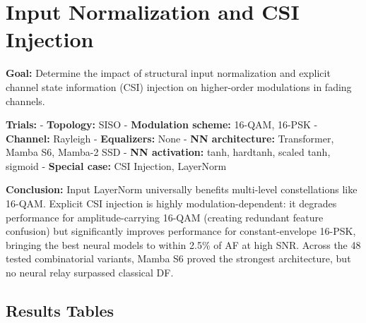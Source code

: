 \section{Input Normalization and CSI Injection}\label{sec:input-normalization-and-csi-injection}

\textbf{Goal:} Determine the impact of structural input normalization and explicit channel state information (CSI) injection on higher-order modulations in fading channels.

\textbf{Trials:} - \textbf{Topology:} SISO - \textbf{Modulation scheme:} 16-QAM, 16-PSK - \textbf{Channel:} Rayleigh - \textbf{Equalizers:} None - \textbf{NN architecture:} Transformer, Mamba S6, Mamba-2 SSD - \textbf{NN activation:} tanh, hardtanh, scaled tanh, sigmoid - \textbf{Special case:} CSI Injection, LayerNorm

\textbf{Conclusion:} Input LayerNorm universally benefits multi-level constellations like 16-QAM. Explicit CSI injection is highly modulation-dependent: it degrades performance for amplitude-carrying 16-QAM (creating redundant feature confusion) but significantly improves performance for constant-envelope 16-PSK, bringing the best neural models to within 2.5\% of AF at high SNR. Across the 48 tested combinatorial variants, Mamba S6 proved the strongest architecture, but no neural relay surpassed classical DF.

\subsection{Results Tables}\label{sec:results-tables-4}


